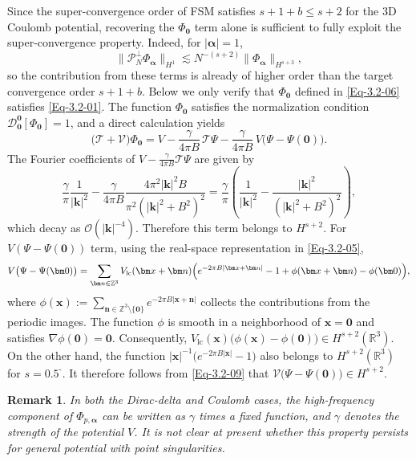 \documentclass{sn-jnl}%
\newcommand{\m}{\textbf{-}}
\numberwithin{equation}{section}
\theoremstyle{thmstyleone}%
\theoremstyle{thmstyletwo}%
\newtheorem{remark}{Remark}%
\theoremstyle{thmstylethree}%
\begin{document}
Since the super-convergence order of FSM satisfies $s+1+b\leq s+2$ for the 3D Coulomb potential, recovering the $\Phi_{\bm 0}$ term alone is sufficient to fully exploit the super-convergence property. Indeed, for $|\bm \alpha|=1$,
\[
\|\mathcal{P}_{N}^{\perp}\Phi_{\bm \alpha}\|_{H^1}
\lesssim
N^{-(s+2)}
\|\Phi_{\bm \alpha}\|_{H^{s+3}},
\]
so the contribution from these terms is already of higher order than the target convergence order $s+1+b$. Below we only verify that $\Phi_{\bm 0}$ defined in \eqref{Eq-3.2-06} satisfies \eqref{Eq-3.2-01}.
The function $\Phi_{\bm 0}$ satisfies the normalization condition
$\mathcal{D}^{\bm 0}_{\bm 0}[\Phi_{\bm 0}] = 1$, and a direct calculation yields
\begin{equation}
    \bigl(\mathcal{T}+\mathcal{V}\bigr)\Phi_{\bm 0}
    = V -\frac{\gamma}{4\pi B}\,\mathcal{T}\Psi
      - \frac{\gamma}{4\pi B}\, V\bigl(\Psi-\Psi(\bm 0)\bigr).
\end{equation}
The Fourier coefficients of
$V - \frac{\gamma}{4\pi B}\mathcal{T}\Psi$ are given by
\[
    \frac{\gamma}{\pi}\frac{1}{|\bm k|^2} - \frac{\gamma}{4\pi B}\frac{4\pi^2 |\bm k|^2B}{\pi^2(|\bm k|^2+B^2)^2} = \frac{\gamma}{\pi}\left(\frac{1}{|\bm k|^2}-\frac{|\bm k|^2}{(|\bm k|^2+B^2)^2}\right),
\]
which decay as $\mathcal{O}(|\bm k|^{-4})$. Therefore this term belongs to
$H^{s+2}$. For $ V(\Psi-\Psi(\bm 0))$ term, using the real-space representation in
\eqref{Eq-3.2-05}, 
\begin{equation}\label{Eq-3.2-09}
    V\bigl(\Psi-\Psi(\bm 0)\bigr)
    = \sum_{\bm n \in \mathbb{Z}^3}
    V_{\mathrm{lc}}(\bm x+\bm n)
    \Bigl(
        e^{-2\pi B|\bm x+\bm n|}-1
        + \phi(\bm x+\bm n)
        - \phi(\bm 0)
    \Bigr),
\end{equation}
where $\phi(\bm x)
    := \sum_{\bm n\in \mathbb{Z}^3\setminus\{\bm 0\}}
    e^{-2\pi B|\bm x+\bm n|}$
collects the contributions from the periodic images. The function $\phi$ is smooth in a neighborhood of $\bm x=\bm 0$ and satisfies $\nabla\phi(\bm 0)=\bm 0$. Consequently,
$
    V_{\mathrm{lc}}(\bm x)\bigl(\phi(\bm x)-\phi(\bm 0)\bigr)
    \in H^{s+2}(\mathbb{R}^3).
$ On the other hand, the function $|\bm x|^{-1}\bigl(e^{-2\pi B|\bm x|}-1\bigr)$ also belongs to $H^{s+2}(\mathbb{R}^3)$ for $s=0.5^{\m}$.
It therefore follows from \eqref{Eq-3.2-09} that $ \mathcal V\bigl(\Psi-\Psi(\bm 0)\bigr)\in H^{s+2} $. 

\begin{remark}
    In both the Dirac-delta and Coulomb cases, the high-frequency component of $\Phi_{p, \bm \alpha}$ can be written as $\gamma$ times a fixed function, and $\gamma$ denotes the strength of the potential $V$. It is not clear at present whether this property persists for general potential with point singularities.
\end{remark}
\end{document}
